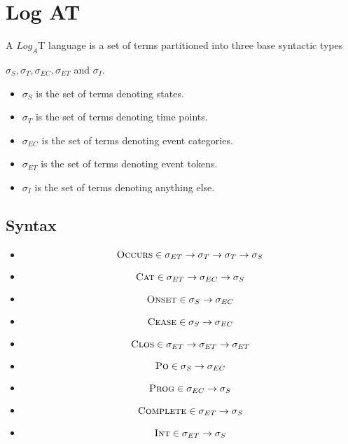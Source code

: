 \chapter{Log AT}

A $Log_A$T language is a set of terms partitioned into three base syntactic types

$\sigma_S, \sigma_T, \sigma_{EC}, \sigma_{ET}$ and $ \sigma_I$.

\begin{itemize}
	\item $\sigma_S$ is the set of terms denoting states.
	\item $\sigma_T$ is the set of terms denoting time points.
	\item $\sigma_{EC}$ is the set of terms denoting event categories.
	\item $\sigma_{ET}$ is the set of terms denoting event tokens.
	\item $\sigma_I$ is the set of terms denoting anything else.
\end{itemize}


\section{Syntax}


\begin{itemize}

	\item
	      \[
		      \textsc{Occurs} \in \sigma_{ET} \to \sigma_T \to \sigma_T \to \sigma_S
	      \]

	\item
	      \[
		      \textsc{Cat} \in \sigma_{ET} \to \sigma_{EC} \to \sigma_S
	      \]

	\item
	      \[
		      \textsc{Onset} \in \sigma_S \to \sigma_{EC}
	      \]

	\item
	      \[
		      \textsc{Cease} \in \sigma_S \to \sigma_{EC}
	      \]

	\item
	      \[
		      \textsc{Clos} \in \sigma_{ET} \to \sigma_{ET} \to \sigma_{ET}
	      \]

	\item
	      \[
		      \textsc{Po} \in \sigma_S \to \sigma_{EC}
	      \]

	\item
	      \[
		      \textsc{Prog} \in \sigma_{EC} \to \sigma_S
	      \]
	\item \[
		      \textsc{Complete} \in \sigma_{ET} \to \sigma_S
	      \]
	\item \[
		      \textsc{Int} \in \sigma_{ET} \to \sigma_S
	      \]
\end{itemize}

